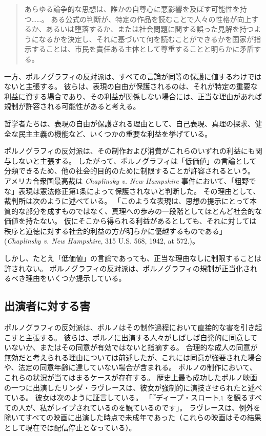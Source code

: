 \documentclass[paper=a4,book,openany]{jlreq}
\begin{document}
\begin{quote}

あらゆる論争的な思想は、誰かの自尊心に悪影響を及ぼす可能性を持つ……。
ある公式の判断が、特定の作品を読むことで人々の性格が向上するか、あるいは堕落するか、または社会問題に関する誤った見解を持つようになるかを決定し、それに基づいて何を読むことができるかを国家が指示することは、市民を責任ある主体として尊重することと明らかに矛盾する。
\citep[pp.206--208]{dworkin96:_freed_law}

\end{quote}

一方、ポルノグラフィの反対派は、すべての言論が同等の保護に値するわけではないと主張する。
彼らは、表現の自由が保護されるのは、それが特定の重要な利益に資する場合であり、その利益が関係しない場合には、正当な理由があれば規制が許容される可能性があると考える。

哲学者たちは、表現の自由が保護される理由として、自己表現、真理の探求、健全な民主主義の機能など、いくつかの重要な利益を挙げている\citep{scanlon11:_why_not_base_free_speec_auton_democ}。

ポルノグラフィの反対派は、その制作および消費がこれらのいずれの利益にも関与しないと主張する。
したがって、ポルノグラフィは「低価値」の言論として分類できるため、他の社会的目的のために制限することが許容されるという。
アメリカ合衆国最高裁は \emph{Chaplinsky v. New Hampshire} 事件において、「粗野でな」表現は憲法修正第1条によって保護されないと判断した。
その理由として、裁判所は次のように述べている。
「このような表現は、思想の提示にとって本質的な部分を成すものではなく、真理への歩みの一段階としてほとんど社会的な価値を持たない。
仮にそこから得られる利益があるとしても、それに対しては秩序と道徳に対する社会的利益の方が明らかに優越するものである」(\emph{Chaplinsky v. New Hampshire}, 315 U.S. 568, 1942, at 572.)。

しかし、たとえ「低価値」の言論であっても、正当な理由なしに制限することは許されない。
ポルノグラフィの反対派は、ポルノグラフィの規制が正当化されるべき理由をいくつか提示している。

\subsection{出演者に対する害}

ポルノグラフィの反対派は、ポルノはその制作過程において直接的な害を引き起こすと主張する。
彼らは、ポルノに出演する人々がしばしば自発的に同意していないか、またはその同意が有効ではないと指摘する。
合理的な成人の同意が無効だと考えられる理由については前述したが、これには同意が強要された場合や、法定の同意年齢に達していない場合が含まれる。
ポルノの制作において、これらの状況が当てはまるケースが存在する。
歴史上最も成功したポルノ映画の一つに出演したリンダ・ラヴレースは、彼女が強制的に演技させられたと述べている。
彼女は次のように証言している。
「『ディープ・スロート』を観るすべての人が、私がレイプされているのを観ているのです」\citep{bailey05:_insid_deep_throat}。
ラヴレースは、例外を除いてすべての映画に出演した時点で未成年であった（これらの映画はその結果として現在では配信停止となっている）。
\end{document}
